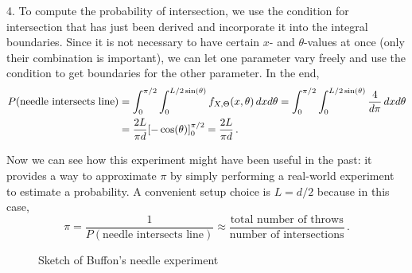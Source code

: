 \begin{ex}
4. To compute the probability of intersection, we use the condition for intersection that has just been derived and incorporate it into the integral boundaries. Since it is not necessary to have certain $x$- and $\theta$-values at once (only their combination is important), we can let one parameter vary freely and use the condition to get boundaries for the other parameter. In the end,
\begin{align*}
P(\text{needle intersects line}) &= \int_0^{\pi / 2} \int_0^{L / 2 \sin(\theta)} f_{X, \Theta}(x, \theta) \, dx d\theta = \int_0^{\pi / 2} \int_0^{L / 2 \sin(\theta)} \frac{4}{d \pi} \, dx d\theta
\\
&= \frac{2 L}{\pi d} \qty[-\cos(\theta)]_0^{\pi / 2} = \frac{2 L}{\pi d} \, .
\end{align*}

Now we can see how this experiment might have been useful in the past: it provides a way to approximate $\pi$ by simply performing a real-world experiment to estimate a probability. A convenient setup choice is $L = d / 2$ because in this case,
\begin{equation*}
\pi = \frac{1}{P(\text{needle intersects line})} \approx \frac{\text{total number of throws}}{\text{number of intersections}} \, .
\end{equation*}
\end{ex}



\begin{figure}[t]
\centering


\caption{Sketch of Buffon's needle experiment}
\label{fig:buffon_needle}
\end{figure}



